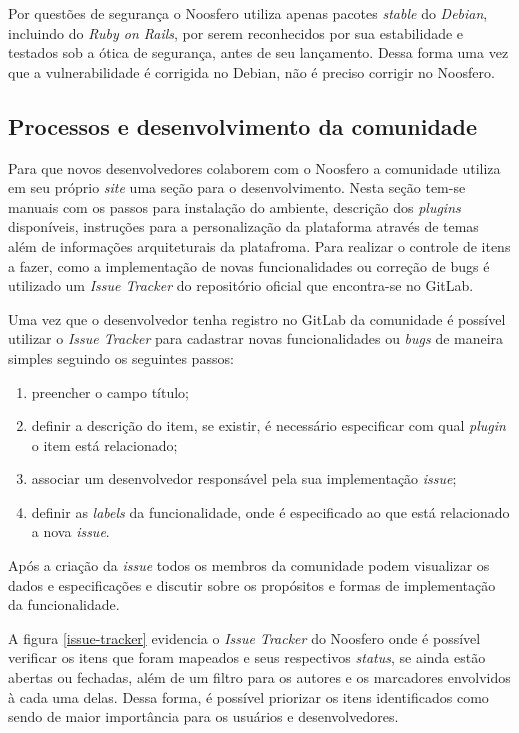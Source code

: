 Por questões de segurança o Noosfero utiliza apenas pacotes \textit{stable} do \textit{Debian}, incluindo do \textit{Ruby on Rails}, por serem reconhecidos por sua estabilidade e testados sob a ótica de segurança, antes de seu lançamento. Dessa forma uma vez que a vulnerabilidade é corrigida no Debian, não é preciso corrigir no Noosfero.

\subsection{Processos e desenvolvimento da comunidade}
\label{proc-desenvol-comunidade}

Para que novos desenvolvedores colaborem com o Noosfero a comunidade utiliza em seu próprio \textit{site} uma seção para o desenvolvimento. Nesta seção tem-se manuais com os passos para instalação do ambiente, descrição dos \textit{plugins} disponíveis, instruções para a personalização da plataforma através de temas além de informações arquiteturais da platafroma. Para realizar o controle de itens a fazer, como a implementação de novas funcionalidades ou correção de bugs é utilizado um \textit{Issue Tracker} do repositório oficial que encontra-se no GitLab.

Uma vez que o desenvolvedor tenha registro no GitLab da comunidade é possível utilizar o \textit{Issue Tracker} para cadastrar novas funcionalidades ou \textit{bugs} de maneira simples seguindo os seguintes passos:

\begin{enumerate}
\item preencher o campo título;
\item definir a descrição do item, se existir, é necessário especificar com qual \textit{plugin} o item está relacionado;
\item associar um desenvolvedor responsável pela sua implementação \textit{issue};
\item definir as \textit{labels} da funcionalidade, onde é especificado ao que está relacionado a nova \textit{issue}.
\end{enumerate}

Após a criação da \textit{issue} todos os membros da comunidade podem visualizar os dados e especificações e discutir sobre os propósitos e formas de implementação da funcionalidade.

A figura \ref{issue-tracker} evidencia o \textit{Issue Tracker} do Noosfero onde é possível verificar os itens que foram mapeados e seus respectivos \textit{status}, se ainda estão abertas ou fechadas, além de um filtro para os autores e os marcadores envolvidos à cada uma delas. Dessa forma, é possível priorizar os itens identificados como sendo de maior importância para os usuários e desenvolvedores.

